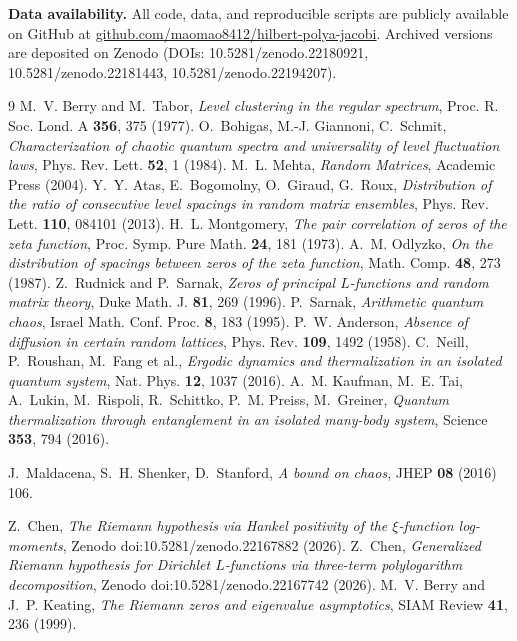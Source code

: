 \documentclass[aps,prx,reprint,floatfix]{revtex4-2}
\begin{document}
\begin{widetext}
\textbf{Data availability.} All code, data, and reproducible scripts are
publicly available on GitHub at
\href{https://github.com/maomao8412/hilbert-polya-jacobi}{github.com/maomao8412/hilbert-polya-jacobi}.
Archived versions are deposited on Zenodo (DOIs: 10.5281/zenodo.22180921,
10.5281/zenodo.22181443, 10.5281/zenodo.22194207).
\end{widetext}

\begin{thebibliography}{9}
 M.~V. Berry and M.~Tabor,
\emph{Level clustering in the regular spectrum}, Proc. R. Soc. Lond. A
\textbf{356}, 375 (1977).
 O.~Bohigas, M.-J. Giannoni, C.~Schmit,
\emph{Characterization of chaotic quantum spectra and universality of level
fluctuation laws}, Phys. Rev. Lett. \textbf{52}, 1 (1984).
 M.~L. Mehta, \emph{Random Matrices}, Academic Press (2004).
 Y.~Y. Atas, E.~Bogomolny, O.~Giraud, G.~Roux,
\emph{Distribution of the ratio of consecutive level spacings in random
matrix ensembles}, Phys. Rev. Lett. \textbf{110}, 084101 (2013).
 H.~L. Montgomery, \emph{The pair correlation of
zeros of the zeta function}, Proc. Symp. Pure Math. \textbf{24}, 181
(1973).
 A.~M. Odlyzko, \emph{On the distribution of spacings
between zeros of the zeta function}, Math. Comp. \textbf{48}, 273 (1987).
 Z.~Rudnick and P.~Sarnak, \emph{Zeros of principal
$L$-functions and random matrix theory}, Duke Math. J. \textbf{81}, 269
(1996).
 P.~Sarnak, \emph{Arithmetic quantum chaos}, Israel
Math. Conf. Proc. \textbf{8}, 183 (1995).
 P.~W. Anderson, \emph{Absence of diffusion in certain
random lattices}, Phys. Rev. \textbf{109}, 1492 (1958).
 C.~Neill, P.~Roushan, M.~Fang et al.,
\emph{Ergodic dynamics and thermalization in an isolated quantum system},
Nat. Phys. \textbf{12}, 1037 (2016).
 A.~M. Kaufman, M.~E. Tai, A.~Lukin, M.~Rispoli,
R.~Schittko, P.~M. Preiss, M.~Greiner, \emph{Quantum thermalization through
entanglement in an isolated many-body system}, Science \textbf{353}, 794
(2016).

 J.~Maldacena, S.~H. Shenker, D.~Stanford,
  \emph{A bound on chaos}, JHEP \textbf{08} (2016) 106.

 Z.~Chen, \emph{The Riemann hypothesis via Hankel
positivity of the $\xi$-function log-moments},
Zenodo doi:10.5281/zenodo.22167882 (2026).
 Z.~Chen, \emph{Generalized Riemann hypothesis for
Dirichlet $L$-functions via three-term polylogarithm decomposition},
Zenodo doi:10.5281/zenodo.22167742 (2026).
 M.~V. Berry and J.~P. Keating,
  \emph{The Riemann zeros and eigenvalue asymptotics}, SIAM Review \textbf{41}, 236 (1999).


\end{thebibliography}
\end{document}
